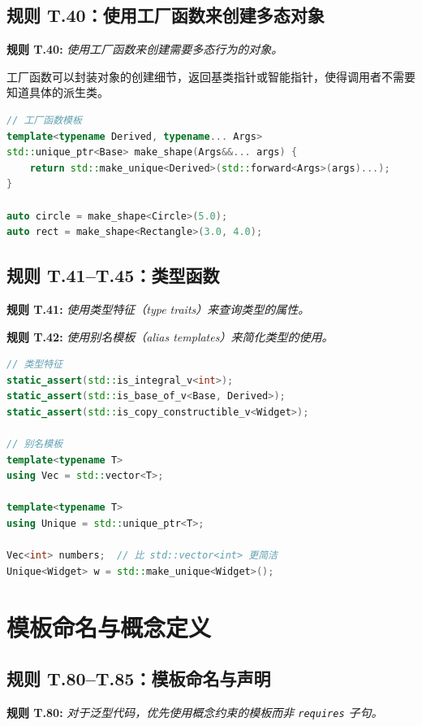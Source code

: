 \subsection{规则 T.40：使用工厂函数来创建多态对象}

\textbf{规则 T.40:} \textit{使用工厂函数来创建需要多态行为的对象。}

工厂函数可以封装对象的创建细节，返回基类指针或智能指针，使得调用者不需要知道具体的派生类。

\begin{lstlisting}[language=C++]
// 工厂函数模板
template<typename Derived, typename... Args>
std::unique_ptr<Base> make_shape(Args&&... args) {
    return std::make_unique<Derived>(std::forward<Args>(args)...);
}

auto circle = make_shape<Circle>(5.0);
auto rect = make_shape<Rectangle>(3.0, 4.0);
\end{lstlisting}

\subsection{规则 T.41--T.45：类型函数}

\textbf{规则 T.41:} \textit{使用类型特征（type traits）来查询类型的属性。}

\textbf{规则 T.42:} \textit{使用别名模板（alias templates）来简化类型的使用。}

\begin{lstlisting}[language=C++]
// 类型特征
static_assert(std::is_integral_v<int>);
static_assert(std::is_base_of_v<Base, Derived>);
static_assert(std::is_copy_constructible_v<Widget>);

// 别名模板
template<typename T>
using Vec = std::vector<T>;

template<typename T>
using Unique = std::unique_ptr<T>;

Vec<int> numbers;  // 比 std::vector<int> 更简洁
Unique<Widget> w = std::make_unique<Widget>();
\end{lstlisting}

\section{模板命名与概念定义}

\subsection{规则 T.80--T.85：模板命名与声明}

\textbf{规则 T.80:} \textit{对于泛型代码，优先使用概念约束的模板而非 \texttt{requires} 子句。}

